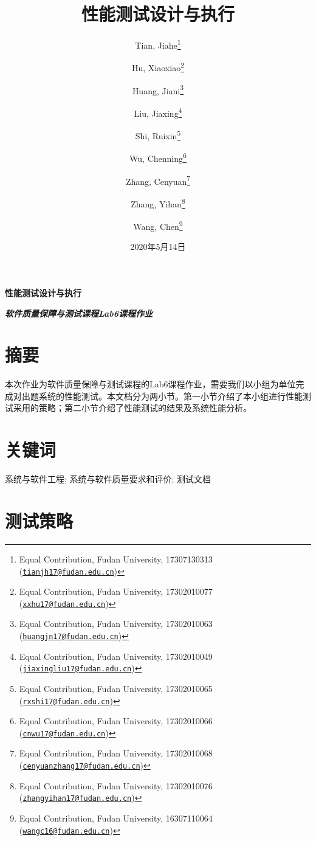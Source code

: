 \documentclass[hyperref, a4paper]{ctexart}
\title{\vspace{2in} 性能测试设计与执行\\\vspace{0.5em}{\large 软件质量保障与测试课程Lab6课程作业（第9组）}}
\author{Tian, Jiahe\footnote{Equal Contribution, Fudan University, 17307130313
  (\href{mailto:tianjh17@fudan.edu.cn}{\nolinkurl{tianjh17@fudan.edu.cn}})} \and Hu, Xiaoxiao\footnote{Equal Contribution, Fudan University, 17302010077
  (\href{mailto:xxhu17@fudan.edu.cn}{\nolinkurl{xxhu17@fudan.edu.cn}})} \and Huang, Jiani\footnote{Equal Contribution, Fudan University, 17302010063
  (\href{mailto:huangjn17@fudan.edu.cn}{\nolinkurl{huangjn17@fudan.edu.cn}})} \and Liu, Jiaxing\footnote{Equal Contribution, Fudan University, 17302010049
  (\href{mailto:jiaxingliu17@fudan.edu.cn}{\nolinkurl{jiaxingliu17@fudan.edu.cn}})} \and Shi, Ruixin\footnote{Equal Contribution, Fudan University, 17302010065
  (\href{mailto:rxshi17@fudan.edu.cn}{\nolinkurl{rxshi17@fudan.edu.cn}})} \and Wu, Chenning\footnote{Equal Contribution, Fudan University, 17302010066
  (\href{mailto:cnwu17@fudan.edu.cn}{\nolinkurl{cnwu17@fudan.edu.cn}})} \and Zhang, Cenyuan\footnote{Equal Contribution, Fudan University,
  17302010068
  (\href{mailto:cenyuanzhang17@fudan.edu.cn}{\nolinkurl{cenyuanzhang17@fudan.edu.cn}})} \and Zhang, Yihan\footnote{Equal Contribution, Fudan University, 17302010076
  (\href{mailto:zhangyihan17@fudan.edu.cn}{\nolinkurl{zhangyihan17@fudan.edu.cn}})} \and Wang, Chen\footnote{Equal Contribution, Fudan University, 16307110064
  (\href{mailto:wangc16@fudan.edu.cn}{\nolinkurl{wangc16@fudan.edu.cn}})}}
\date{2020年5月14日}
\begin{document}
\maketitle

\newpage

\LARGE

\begin{center}
\textbf{性能测试设计与执行}
\end{center}

\large
\begin{center}
\textbf{\emph{软件质量保障与测试课程Lab6课程作业}}
\end{center}

\hypertarget{ux6458ux8981}{%
\section*{摘要}\label{ux6458ux8981}}

本次作业为软件质量保障与测试课程的Lab6课程作业，需要我们以小组为单位完成对出题系统的性能测试。本文档分为两小节。第一小节介绍了本小组进行性能测试采用的策略；第二小节介绍了性能测试的结果及系统性能分析。

\hypertarget{ux5173ux952eux8bcd}{%
\section*{关键词}\label{ux5173ux952eux8bcd}}

系统与软件工程; 系统与软件质量要求和评价; 测试文档

\normalsize

\newpage

\tableofcontents

\newpage

\hypertarget{ux6d4bux8bd5ux7b56ux7565}{%
\section{测试策略}\label{ux6d4bux8bd5ux7b56ux7565}}
\end{document}
